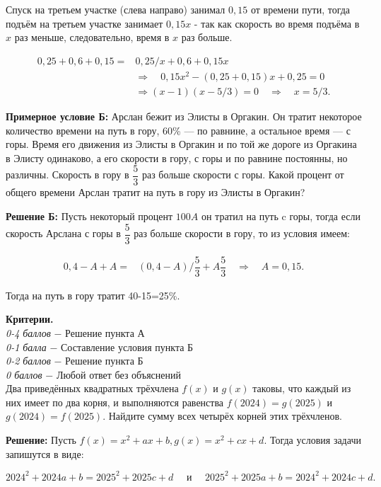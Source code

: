 Спуск на третьем участке (слева направо) занимал $0,15$ от времени пути, тогда подъём на третьем участке занимает $0,15 x$ - так как скорость во время подъёма в $x$ раз меньше, следовательно, время в $x$ раз больше.

$$
\begin{aligned}
0,25+0,6+0,15= & 0,25 / x+0,6+0,15 x \quad \\
& \Rightarrow \quad 0,15 x^2-(0,25+0,15) x+0,25=0 \\
& \Rightarrow(x-1)(x-5 / 3)=0 \quad \Rightarrow \quad x=5 / 3 .
\end{aligned}
$$


\textbf{Примерное условие Б:}  Арслан бежит из Элисты в Оргакин. Он тратит некоторое количество времени на путь в гору, 60\% — по равнине, а остальное время — с горы. Время его движения из Элисты в Оргакин и по той же дороге из Оргакина в Элисту одинаково, а его скорости в гору, с горы и по равнине постоянны, но различны. Скорость в гору в $\dfrac{5}{3}$ раз больше скорости с горы. Какой процент от общего времени Арслан тратит на путь в гору из Элисты в Оргакин?

\textbf{Решение Б:} Пусть некоторый процент $100A$ он тратил на путь c горы, тогда если скорость Арслана с горы в $\dfrac{5}{3}$ раз больше скорости в гору, то из условия имеем:

$$
\begin{aligned}
0,4-A+A= & (0,4-A )/ \dfrac{5}{3}+A \dfrac{5}{3} \quad \Rightarrow \quad A=0,15 .
\end{aligned}
$$

Тогда на путь в гору тратит 40-15=25\%.

\textbf{Критерии.} \\
\textit{0-4 баллов} $-$ Решение пункта А\\
\textit{0-1 балла} $-$ Составление условия пункта Б \\
\textit{0-2 баллов} $-$ Решение пункта Б\\
\textit{0 баллов} $-$ Любой ответ без объяснений\\

 Два приведённых квадратных трёхчлена $f(x)$ и $g(x)$ таковы, что каждый из них имеет по два корня, и выполняются равенства $f(2024)=g(2025)$ и $g(2024)=f(2025)$. Найдите сумму всех четырёх корней этих трёхчленов.

\textbf{Решение:} Пусть $f(x)=x^2+a x+b, g(x)=x^2+c x+d$. Тогда условия задачи запишутся в виде:

$$
2024^2+2024a+b=2025^2+2025 c+d \quad \text { и } \quad 2025^2+2025 a+b=2024^2+2024c+d .
$$


